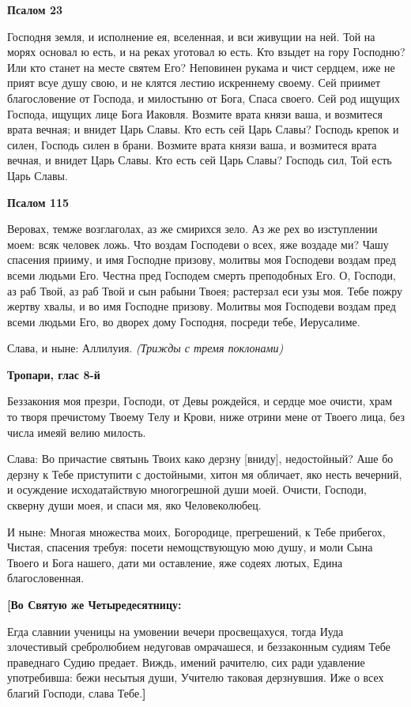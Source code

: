 \medskip
\bfseries Псалом 23\normalfont{}


Господня земля, и исполнение ея, вселенная, и вси живущии на ней. Той на морях основал ю есть, и на реках уготовал ю есть. Кто взыдет на гору Господню? Или кто станет на месте святем Его? Неповинен рукама и чист сердцем, иже не прият всуе душу свою, и не клятся лестию искреннему своему. Сей приимет благословение от Господа, и милостыню от Бога, Спаса своего. Сей род ищущих Господа, ищущих лице Бога Иаковля. Возмите врата князи ваша, и возмитеся врата вечная; и внидет Царь Славы. Кто есть сей Царь Славы? Господь крепок и силен, Господь силен в брани. Возмите врата князи ваша, и возмитеся врата вечная, и внидет Царь Славы. Кто есть сей Царь Славы? Господь сил, Той есть Царь Славы.


\medskip
\bfseries Псалом 115\normalfont{}


Веровах, темже возглаголах, аз же смирихся зело. Аз же рех во изступлении моем: всяк человек ложь. Что воздам Господеви о всех, яже воздаде ми? Чашу спасения прииму, и имя Господне призову, молитвы моя Господеви воздам пред всеми людьми Его. Честна пред Господем смерть преподобных Его. О, Господи, аз раб Твой, аз раб Твой и сын рабыни Твоея; растерзал еси узы моя. Тебе пожру жертву хвалы, и во имя Господне призову. Молитвы моя Господеви воздам пред всеми людьми Его, во дворех дому Господня, посреди тебе, Иерусалиме.


Слава, и ныне: Аллилуия. \itshape (Трижды с тремя поклонами)\normalfont{}


\medskip
\bfseries Тропари, глас 8-й\normalfont{}


Беззакония моя презри, Господи, от Девы рождейся, и сердце мое очисти, храм то творя пречистому Твоему Телу и Крови, ниже отрини мене от Твоего лица, без числа имеяй велию милость.


Слава: Во причастие святынь Твоих како дерзну [вниду], недостойный? Аше бо дерзну к Тебе приступити с достойными, хитон мя обличает, яко несть вечерний, и осуждение исходатайствую многогрешной души моей. Очисти, Господи, скверну души моея, и спаси мя, яко Человеколюбец.


И ныне: Многая множества моих, Богородице, прегрешений, к Тебе прибегох, Чистая, спасения требуя: посети немощствующую мою душу, и моли Сына Твоего и Бога нашего, дати ми оставление, яже содеях лютых, Едина благословенная.


\medskip
\bfseries [Во Святую же Четыредесятницу:\normalfont{}


Егда славнии ученицы на умовении вечери просвещахуся, тогда Иуда злочестивый сребролюбием недуговав омрачашеся, и беззаконным судиям Тебе праведнаго Судию предает. Виждь, имений рачителю, сих ради удавление употребивша: бежи несытыя души, Учителю таковая дерзнувшия. Иже о всех благий Господи, слава Тебе.\bfseries ]\normalfont{}


